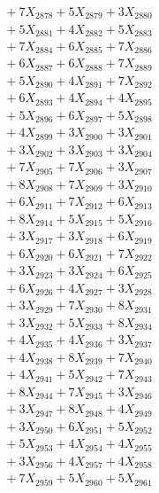 \documentclass[a4paper,10pt]{article}
\begin{document}
{\begin{align}
&\;  + 7 X_{2878} + 5 X_{2879} + 3 X_{2880} \\[0.3ex]
&\;  + 5 X_{2881} + 4 X_{2882} + 5 X_{2883} \\[0.3ex]
&\;  + 7 X_{2884} + 6 X_{2885} + 7 X_{2886} \\[0.3ex]
&\;  + 6 X_{2887} + 6 X_{2888} + 7 X_{2889} \\[0.5ex]\allowbreak
&\;  + 5 X_{2890} + 4 X_{2891} + 7 X_{2892} \\[0.3ex]
&\;  + 6 X_{2893} + 4 X_{2894} + 4 X_{2895} \\[0.3ex]
&\;  + 5 X_{2896} + 6 X_{2897} + 5 X_{2898} \\[0.3ex]
&\;  + 4 X_{2899} + 3 X_{2900} + 3 X_{2901} \\[0.3ex]
&\;  + 3 X_{2902} + 3 X_{2903} + 3 X_{2904} \\[0.3ex]
&\;  + 7 X_{2905} + 7 X_{2906} + 3 X_{2907} \\[0.3ex]
&\;  + 8 X_{2908} + 7 X_{2909} + 3 X_{2910} \\[0.3ex]
&\;  + 6 X_{2911} + 7 X_{2912} + 6 X_{2913} \\[0.3ex]
&\;  + 8 X_{2914} + 5 X_{2915} + 5 X_{2916} \\[0.3ex]
&\;  + 3 X_{2917} + 3 X_{2918} + 6 X_{2919} \\[0.5ex]\allowbreak
&\;  + 6 X_{2920} + 6 X_{2921} + 7 X_{2922} \\[0.3ex]
&\;  + 3 X_{2923} + 3 X_{2924} + 6 X_{2925} \\[0.3ex]
&\;  + 6 X_{2926} + 4 X_{2927} + 3 X_{2928} \\[0.3ex]
&\;  + 3 X_{2929} + 7 X_{2930} + 8 X_{2931} \\[0.3ex]
&\;  + 3 X_{2932} + 5 X_{2933} + 8 X_{2934} \\[0.3ex]
&\;  + 4 X_{2935} + 4 X_{2936} + 3 X_{2937} \\[0.3ex]
&\;  + 4 X_{2938} + 8 X_{2939} + 7 X_{2940} \\[0.3ex]
&\;  + 4 X_{2941} + 5 X_{2942} + 7 X_{2943} \\[0.3ex]
&\;  + 8 X_{2944} + 7 X_{2945} + 3 X_{2946} \\[0.3ex]
&\;  + 3 X_{2947} + 8 X_{2948} + 4 X_{2949} \\[0.5ex]\allowbreak
&\;  + 3 X_{2950} + 6 X_{2951} + 5 X_{2952} \\[0.3ex]
&\;  + 5 X_{2953} + 4 X_{2954} + 4 X_{2955} \\[0.3ex]
&\;  + 3 X_{2956} + 4 X_{2957} + 4 X_{2958} \\[0.3ex]
&\;  + 7 X_{2959} + 5 X_{2960} + 5 X_{2961} \\[0.3ex]

\end{align}}
\end{document}
